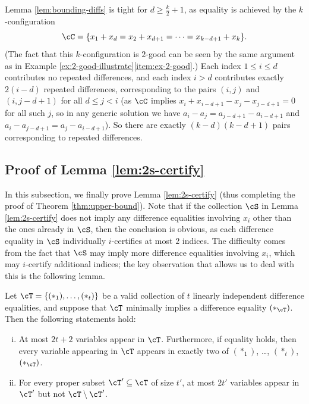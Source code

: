 \begin{remark}\label{rmk:bounding-diffs-equality}
    Lemma \ref{lem:bounding-diffs} is tight for $d \geq \frac{k}{2} + 1$, as equality is achieved by the $k$-configuration \[\cC = \{x_1 + x_d = x_2 + x_{d + 1} = \cdots = x_{k - d + 1} + x_k\}.\] (The fact that this $k$-configuration is $2$-good can be seen by the same argument as in Example \ref{ex:2-good-illustrate}\ref{item:ex-2-good}.) Each index $1 \leq i \leq d$ contributes no repeated differences, and each index $i > d$ contributes exactly $2(i - d)$ repeated differences, corresponding to the pairs $(i, j)$ and $(i, j - d + 1)$ for all $d \leq j < i$ (as $\cC$ implies $x_i + x_{i - d + 1} - x_j - x_{j - d + 1} = 0$ for all such $j$, so in any generic solution we have $a_i - a_j = a_{j - d + 1} - a_{i - d + 1}$ and $a_i - a_{j - d + 1} = a_j - a_{i - d + 1}$). So there are exactly $(k - d)(k - d + 1)$ pairs corresponding to repeated differences. 
\end{remark}

\subsection{Proof of Lemma \ref{lem:2s-certify}} \label{subsec:2s-certify}

In this subsection, we finally prove Lemma \ref{lem:2s-certify} (thus completing the proof of Theorem \ref{thm:upper-bound}). Note that if the collection $\cS$ in Lemma \ref{lem:2s-certify} does not imply any difference equalities involving $x_i$ other than the ones already in $\cS$, then the conclusion is obvious, as each difference equality in $\cS$ individually $i$-certifies at most $2$ indices. The difficulty comes from the fact that $\cS$ may imply more difference equalities involving $x_i$, which may $i$-certify additional indices; the key observation that allows us to deal with this is the following lemma. 

\begin{lemma}\label{lem:gen-min-impl}
    Let $\cT = \{(*_1), \ldots, (*_t)\}$ be a valid collection of $t$ linearly independent difference equalities, and suppose that $\cT$ minimally implies a difference equality $(*_\cT)$. Then the following statements hold: 
    \begin{enumerate}[(i)]
        \item \label{item:gmi-few-total} At most $2t + 2$ variables appear in $\cT$. Furthermore, if equality holds, then every variable appearing in $\cT$ appears in exactly two of $(*_1)$, \ldots, $(*_t)$, $(*_\cT)$. 
        \item \label{item:gmi-few-new} For every proper subset $\cT' \subseteq \cT$ of size $t'$, at most $2t'$ variables appear in $\cT'$ but not $\cT \setminus \cT'$. 
    \end{enumerate}
\end{lemma}


